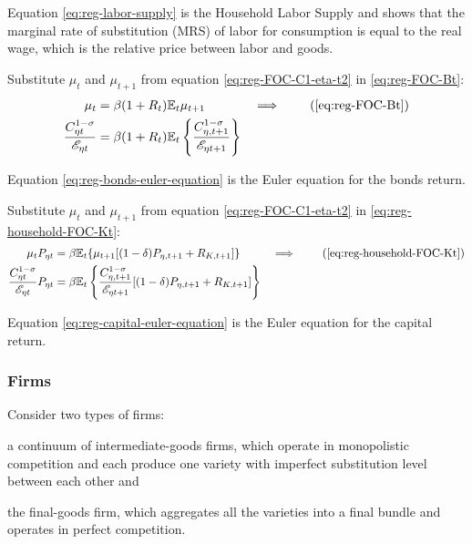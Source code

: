 \documentclass[
thesis.tex
]{subfiles}
\begin{document}
Equation \ref{eq:reg-labor-supply} is the Household Labor Supply and shows that the marginal rate of substitution (MRS) of labor for consumption is equal to the real wage, which is the relative price between labor and goods.

Substitute $\mu_t$ and $\mu_{t+1}$ from equation \ref{eq:reg-FOC-C1-eta-t2} in \ref{eq:reg-FOC-Bt}:
\begin{alignat}{2}
	\mu_t &= \beta (1 + R_{t}) \E{ \mu_{t+1} } &\implies \tag{\ref{eq:reg-FOC-Bt}} 
	\\
	\frac{ C_{\eta t}^{1-\sigma} }{ \te } &= \beta (1 + R_{t}) \E \left\{ \frac{ C_{\eta, t+1}^{1-\sigma} }{ \te[t+1] } \right\} \label{eq:reg-bonds-euler-equation}
\end{alignat}

Equation \ref{eq:reg-bonds-euler-equation} is the Euler equation for the bonds return.

Substitute $\mu_t$ and $\mu_{t+1}$ from equation \ref{eq:reg-FOC-C1-eta-t2} in \ref{eq:reg-household-FOC-Kt}:
\begin{alignat}{2}
	\mu_t P_{\eta t} &= \beta \mathbb{E}_t \{ \mu_{t+1} [(1-\delta) P_{\eta, t+1} + R_{K,t+1}] \} &\implies \tag{\ref{eq:reg-household-FOC-Kt}} 
	\\
	\frac{ C_{\eta t}^{1-\sigma} }{ \te } P_{\eta t} &= \beta \mathbb{E}_t \left\{ \frac{ C_{\eta, t+1}^{1-\sigma} }{ \te[t+1] } [(1-\delta) P_{\eta, t+1} + R_{K,t+1}] \right\} \label{eq:reg-capital-euler-equation}
\end{alignat}

Equation \ref{eq:reg-capital-euler-equation} is the Euler equation for the capital return.


\subsubsection*{Firms}

Consider two types of firms: 
\begin{enumerate*}[label=(\arabic*)]
	\item a continuum of intermediate-goods firms, which operate in monopolistic competition and each produce one variety with imperfect substitution level between each other and
	
	\item the final-goods firm, which aggregates all the varieties into a final bundle and operates in perfect competition.
\end{enumerate*}
\end{document}
